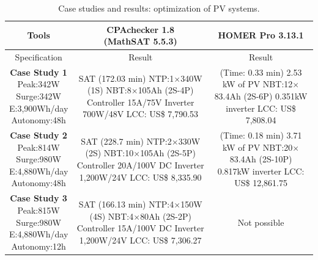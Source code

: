 \documentclass[journal]{IEEEtran}
\begin{document}
\begin{table}[!t]
\caption{Case studies and results: optimization of PV systems.}\label{tab1}
\begin{scriptsize}
\begin{tabular}{|c|c|c|}
\hline
\hline
Tools & \makecell{CPAchecker 1.8\\(MathSAT 5.5.3)}& HOMER Pro 3.13.1\\
\hline
\hline
Specification & Result & Result \\
\hline
\makecell{\textbf{Case Study 1}\\Peak:342W\\Surge:342W \\E:3,900Wh/day\\Autonomy:48h} & \makecell{SAT (172.03 min) \\NTP:1$\times$340W (1S)\\NBT:8$\times$105Ah (2S-4P)\\Controller 15A/75V\\Inverter 700W/48V\\LCC: US\$ 7,790.53} & \makecell{(Time: 0.33 min)\\2.53 kW of PV\\NBT:12$\times$83.4Ah (2S-6P)\\0.351kW inverter\\LCC: US\$ 7,808.04}\\
\hline
\makecell{\textbf{Case Study 2}\\Peak:814W\\Surge:980W\\E:4,880Wh/day\\Autonomy:48h} & \makecell {SAT (228.7 min) \\NTP:2$\times$330W (2S)\\NBT:10$\times$105Ah (2S-5P)\\Controller 20A/100V DC\\Inverter 1,200W/24V \\LCC: US\$ 8,335.90} & \makecell{(Time: 0.18 min)\\3.71 kW of PV\\NBT:20$\times$83.4Ah (2S-10P)\\0.817kW inverter\\LCC: US\$ 12,861.75} \\
\hline
\makecell{\textbf{Case Study 3}\\Peak:815W\\Surge:980W\\E:4,880Wh/day\\Autonomy:12h} & \makecell {SAT (166.13 min) \\NTP:4$\times$150W (4S)\\NBT:4$\times$80Ah (2S-2P)\\Controller 15A/100V DC\\Inverter 1,200W/24V \\LCC: US\$ 7,306.27} & Not possible \\

\end{tabular}
\end{scriptsize}
\end{table}
\end{document}
